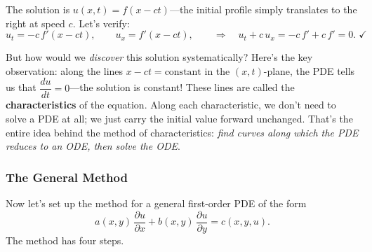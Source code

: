 \noindent The solution is \( u(x,t) = f(x - ct) \)---the initial profile simply translates to the right at speed \( c \). Let's verify:
\[
u_t = -c\,f'(x - ct), \qquad u_x = f'(x - ct), \qquad \Longrightarrow \quad u_t + c\,u_x = -c\,f' + c\,f' = 0. \;\checkmark
\]

\noindent But how would we \textit{discover} this solution systematically? Here's the key observation: along the lines \( x - ct = \text{constant} \) in the \((x,t)\)-plane, the PDE tells us that \( \dfrac{du}{dt} = 0 \)---the solution is constant! These lines are called the \textbf{characteristics} of the equation. Along each characteristic, we don't need to solve a PDE at all; we just carry the initial value forward unchanged. That's the entire idea behind the method of characteristics: \textit{find curves along which the PDE reduces to an ODE, then solve the ODE}.

\subsubsection*{The General Method}

\noindent Now let's set up the method for a general first-order PDE of the form
\[
a(x,y)\,\frac{\partial u}{\partial x} + b(x,y)\,\frac{\partial u}{\partial y} = c(x,y,u).
\]
The method has four steps.

